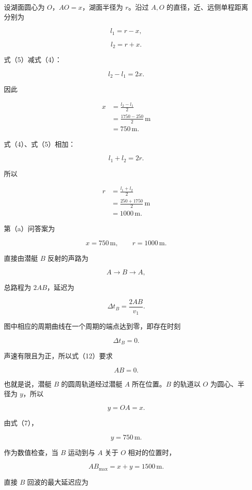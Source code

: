 \documentclass[12pt,a4paper,UTF8]{ctexart}
\begin{document}
设湖面圆心为 \(O\)，\(AO=x\)，湖面半径为 \(r\)。沿过 \(A,O\)
的直径，近、远侧单程距离分别为

\[
l_1=r-x, \tag{4}
\]

\[
l_2=r+x. \tag{5}
\]

式（5）减式（4）：

\[
l_2-l_1=2x. \tag{6}
\]

因此

\[
\begin{aligned}
x
&=\frac{l_2-l_1}{2}\\
&=\frac{1750-250}{2}\,\mathrm m\\
&=750\,\mathrm m.
\end{aligned} \tag{7}
\]

式（4）、式（5）相加：

\[
l_1+l_2=2r. \tag{8}
\]

所以

\[
\begin{aligned}
r
&=\frac{l_1+l_2}{2}\\
&=\frac{250+1750}{2}\,\mathrm m\\
&=1000\,\mathrm m.
\end{aligned} \tag{9}
\]

第（a）问答案为

\[
\boxed{x=750\,\mathrm m,\qquad r=1000\,\mathrm m}. \tag{10}
\]

直接由潜艇 \(B\) 反射的声路为

\[
A\longrightarrow B\longrightarrow A, \tag{11}
\]

总路程为 \(2AB\)，延迟为

\[
\Delta t_B=\frac{2AB}{v_1}. \tag{12}
\]

图中相应的周期曲线在一个周期的端点达到零，即存在时刻

\[
\Delta t_B=0. \tag{13}
\]

声速有限且为正，所以式（12）要求

\[
AB=0. \tag{14}
\]

也就是说，潜艇 \(B\) 的圆周轨道经过潜艇 \(A\) 所在位置。\(B\) 的轨道以
\(O\) 为圆心、半径为 \(y\)，所以

\[
y=OA=x. \tag{15}
\]

由式（7），

\[
\boxed{y=750\,\mathrm m}. \tag{16}
\]

作为数值检查，当 \(B\) 运动到与 \(A\) 关于 \(O\) 相对的位置时，

\[
AB_{\max}=x+y=1500\,\mathrm m. \tag{17}
\]

直接 \(B\) 回波的最大延迟应为
\end{document}
